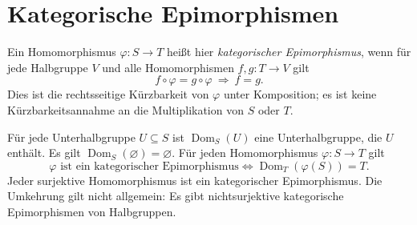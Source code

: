 \section{Kategorische Epimorphismen}

\begin{definition}[Epimorphismus]
Ein Homomorphismus $\varphi:S\to T$ heißt hier \emph{kategorischer
Epimorphismus}, wenn für jede Halbgruppe $V$ und alle Homomorphismen
$f,g:T\to V$ gilt
\[
 f\circ\varphi=g\circ\varphi\ \Longrightarrow\ f=g.
\]
Dies ist die rechtsseitige Kürzbarkeit von $\varphi$ unter Komposition;
es ist keine Kürzbarkeitsannahme an die Multiplikation von $S$ oder $T$.
\end{definition}

\begin{theorem}
\label{b28guide:thm:epi-dominion}
Für jede Unterhalbgruppe $U\subseteq S$ ist
$\operatorname{Dom}_S(U)$ eine Unterhalbgruppe, die $U$ enthält.
Es gilt $\operatorname{Dom}_S(\varnothing)=\varnothing$.
Für jeden Homomorphismus $\varphi:S\to T$ gilt
\[
 \varphi\text{ ist ein kategorischer Epimorphismus}
 \iff
 \operatorname{Dom}_T(\varphi(S))=T .
\]
Jeder surjektive Homomorphismus ist ein kategorischer Epimorphismus.
Die Umkehrung gilt nicht allgemein: Es gibt nichtsurjektive
kategorische Epimorphismen von Halbgruppen.
\cite{isbell1966,alam2019}
\end{theorem}
